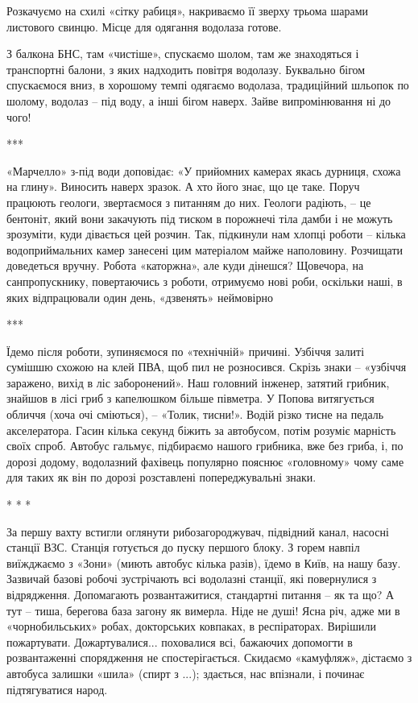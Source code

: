 
Розкачуємо на схилі «сітку рабиця», накриваємо її зверху трьома шарами
листового свинцю. Місце для одягання водолаза готове.


З балкона БНС, там «чистіше», спускаємо шолом, там же знаходяться і транспортні
балони, з яких надходить повітря водолазу. Буквально бігом спускаємося вниз, в
хорошому темпі одягаємо водолаза, традиційний шльопок по шолому, водолаз – під
воду, а інші бігом наверх. Зайве випромінювання ні до чого!

***

«Марчелло» з-під води доповідає: «У прийомних камерах якась дурниця, схожа на
глину». Виносить наверх зразок. А хто його знає, що це таке. Поруч працюють
геологи, звертаємося з питанням до них. Геологи радіють, – це бентоніт, який
вони закачують під тиском в порожнечі тіла дамби і не можуть зрозуміти, куди
дівається цей розчин. Так, підкинули нам хлопці роботи – кілька водоприймальних
камер занесені цим матеріалом майже наполовину. Розчищати доведеться вручну.
Робота «каторжна», але куди дінешся? Щовечора, на санпропускнику, повертаючись
з роботи, отримуємо нові роби, оскільки наші, в яких відпрацювали один день,
«дзвенять» неймовірно


***

Їдемо після роботи, зупиняємося по «технічній» причині. Узбіччя залиті сумішшю
схожою на клей ПВА, щоб пил не розносився. Скрізь знаки – «узбіччя заражено,
вихід в ліс заборонений». Наш головний інженер, затятий грибник, знайшов в лісі
гриб з капелюшком більше півметра. У Попова витягується обличчя (хоча очі
сміються), – «Толик, тисни!». Водій різко тисне на педаль акселератора. Гасин
кілька секунд біжить за автобусом, потім розуміє марність своїх спроб. Автобус
гальмує, підбираємо нашого грибника, вже без гриба, і, по дорозі додому,
водолазний фахівець популярно пояснює «головному» чому саме для таких як він по
дорозі розставлені попереджувальні знаки.


* * *

За першу вахту встигли оглянути рибозагороджувач, підвідний канал, насосні
станції ВЗС. Станція готується до пуску першого блоку. З горем навпіл
виїжджаємо з «Зони» (миють автобус кілька разів), їдемо в Київ, на нашу базу.
Зазвичай базові робочі зустрічають всі водолазні станції, які повернулися з
відрядження. Допомагають розвантажитися, стандартні питання – як та що? А тут –
тиша, берегова база загону як вимерла. Ніде не душі! Ясна річ, адже ми в
«чорнобильських» робах, докторських ковпаках, в респіраторах. Вирішили
пожартувати. Дожартувалися... поховалися всі, бажаючих допомогти в розвантаженні
спорядження не спостерігається. Скидаємо «камуфляж», дістаємо з автобуса
залишки «шила» (спирт з ...); здається, нас впізнали, і починає підтягуватися
народ.


